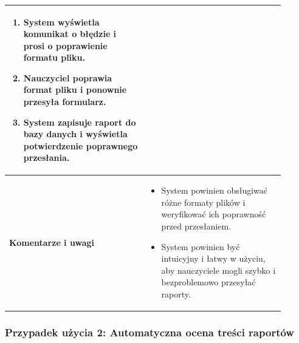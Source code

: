 \documentclass[a4paper, 12pt]{article}
\begin{document}
\begin{center}
\begin{longtable}{|p{0.45\linewidth}|p{0.45\linewidth}|}
\begin{enumerate}
    \item System wyświetla komunikat o błędzie i prosi o poprawienie formatu pliku.
    \item Nauczyciel poprawia format pliku i ponownie przesyła formularz.
    \item System zapisuje raport do bazy danych i wyświetla potwierdzenie poprawnego przesłania.
\end{enumerate} \\
\hline
\textbf{Komentarze i uwagi} &
\begin{itemize}
    \item System powinien obsługiwać różne formaty plików i weryfikować ich poprawność przed przesłaniem.
    \item System powinien być intuicyjny i łatwy w użyciu, aby nauczyciele mogli szybko i bezproblemowo przesyłać raporty.
\end{itemize} \\
\hline
\end{longtable}
\end{center}

\subsubsection*{Przypadek użycia 2: Automatyczna ocena treści raportów}
\end{document}
